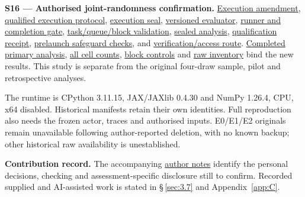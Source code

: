 \documentclass[11pt,a4paper]{article}
\begin{document}
\label{source-s16}

\textbf{S16 --- Authorised joint-randomness confirmation.} \href{\detokenize{../joint_confirmation_2026-09-08/confirmation/EXECUTION_AMENDMENT.md}}{Execution amendment}, \href{\detokenize{../joint_confirmation_2026-09-08/confirmation/PROTOCOL_EXECUTION.md}}{qualified execution protocol}, \href{\detokenize{../joint_confirmation_2026-09-08/confirmation/SEALED_EXECUTION.json}}{execution seal}, \href{\detokenize{../joint_confirmation_2026-09-08/experimental/evaluator_v2.py}}{versioned evaluator}, \href{\detokenize{../joint_confirmation_2026-09-08/confirmation/runner.py}}{runner and completion gate}, \href{\detokenize{../joint_confirmation_2026-09-08/confirmation/validation.py}}{task/queue/block validation}, \href{\detokenize{../joint_confirmation_2026-09-08/confirmation/analyse.py}}{sealed analysis}, \href{\detokenize{../joint_confirmation_2026-09-08/evidence/QUALIFICATION.json}}{qualification receipt}, \href{\detokenize{../joint_confirmation_2026-09-08/evidence/QUALIFICATION_FOLLOWUP.json}}{prelaunch safeguard checks}, and \href{\detokenize{../joint_confirmation_2026-09-08/README.md}}{verification/access route}. \href{\detokenize{../joint_confirmation_2026-09-08/evidence/ANALYSIS.json}}{Completed primary analysis}, \href{\detokenize{../joint_confirmation_2026-09-08/evidence/CELL_RESULTS.csv}}{all cell counts}, \href{\detokenize{../joint_confirmation_2026-09-08/evidence/BLOCK_CONTROLS.json}}{block controls} and \href{\detokenize{../joint_confirmation_2026-09-08/evidence/RAW_INVENTORY.json}}{raw inventory} bind the new results. This study is separate from the original four-draw sample, pilot and retrospective analyses.

The runtime is CPython 3.11.15, JAX/JAXlib 0.4.30 and NumPy 1.26.4, CPU, x64 disabled. Historical manifests retain their own identities. Full reproduction also needs the frozen actor, traces and authorised inputs. E0/E1/E2 originals remain unavailable following author-reported deletion, with no known backup; other historical raw availability is unestablished.

\textbf{Contribution record.} The accompanying \href{\detokenize{AUTHOR_INPUTS.md}}{author notes} identify the personal decisions, checking and assessment-specific disclosure still to confirm. Recorded supplied and AI-assisted work is stated in \S\,\ref{sec:3.7} and Appendix~\ref{app:C}.
\end{document}
